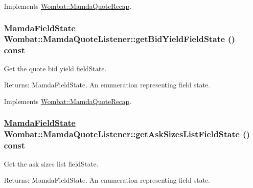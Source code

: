 Implements \hyperlink{classWombat_1_1MamdaQuoteRecap_ef5f4c7d1f09607a9730da3dc5c782d6}{Wombat::Mamda\-Quote\-Recap}.\hypertarget{classWombat_1_1MamdaQuoteListener_fbf8ab1785c570733df4e0790947e489}{
\subsubsection[getBidYieldFieldState]{\setlength{\rightskip}{0pt plus 5cm}\hyperlink{namespaceWombat_93aac974f2ab713554fd12a1fa3b7d2a}{Mamda\-Field\-State} Wombat::Mamda\-Quote\-Listener::get\-Bid\-Yield\-Field\-State () const}}
\label{classWombat_1_1MamdaQuoteListener_fbf8ab1785c570733df4e0790947e489}


Get the quote bid yield field\-State. 

\begin{Desc}
\item[Returns:]Mamda\-Field\-State. An enumeration representing field state. \end{Desc}


Implements \hyperlink{classWombat_1_1MamdaQuoteRecap_015aa2464a9035bc0fc46e8b22464b2d}{Wombat::Mamda\-Quote\-Recap}.\hypertarget{classWombat_1_1MamdaQuoteListener_b943a6dc805ddb2d213d60539538d290}{
\subsubsection[getAskSizesListFieldState]{\setlength{\rightskip}{0pt plus 5cm}\hyperlink{namespaceWombat_93aac974f2ab713554fd12a1fa3b7d2a}{Mamda\-Field\-State} Wombat::Mamda\-Quote\-Listener::get\-Ask\-Sizes\-List\-Field\-State () const}}
\label{classWombat_1_1MamdaQuoteListener_b943a6dc805ddb2d213d60539538d290}


Get the ask sizes list field\-State. 

\begin{Desc}
\item[Returns:]Mamda\-Field\-State. An enumeration representing field state. \end{Desc}


